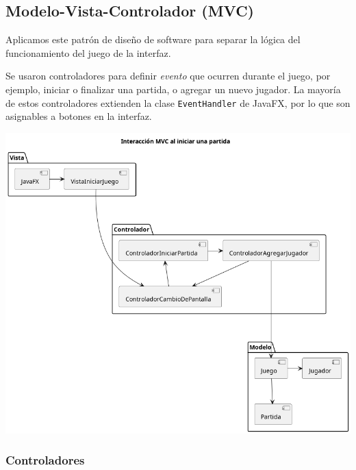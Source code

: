 \documentclass[titlepage,a4paper]{article}
\begin{document}
\subsection{Modelo-Vista-Controlador (MVC)}
\label{sec:orgbdae64b}

Aplicamos este patrón de diseño de software para separar la lógica del
funcionamiento del juego de la interfaz.

Se usaron controladores para definir \emph{evento} que ocurren durante el
juego, por ejemplo, iniciar o finalizar una partida, o agregar un
nuevo jugador. La mayoría de estos controladores extienden la clase
\texttt{EventHandler} de JavaFX, por lo que son asignables a botones en la
interfaz.

\begin{center}
\includegraphics[width=.9\linewidth]{./diagramas/mvc-partida.png}
\end{center}

\subsubsection{Controladores}
\label{sec:orgc8e9b26}
\end{document}
